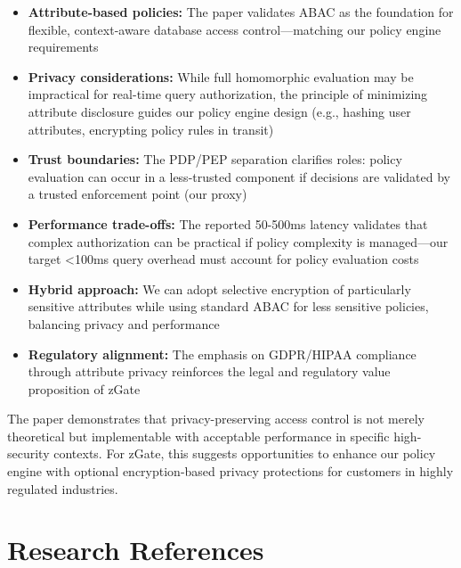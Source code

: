 \begin{itemize}
    \item \textbf{Attribute-based policies:} The paper validates ABAC as the foundation for flexible, context-aware database access control—matching our policy engine requirements
    \item \textbf{Privacy considerations:} While full homomorphic evaluation may be impractical for real-time query authorization, the principle of minimizing attribute disclosure guides our policy engine design (e.g., hashing user attributes, encrypting policy rules in transit)
    \item \textbf{Trust boundaries:} The PDP/PEP separation clarifies roles: policy evaluation can occur in a less-trusted component if decisions are validated by a trusted enforcement point (our proxy)
    \item \textbf{Performance trade-offs:} The reported 50-500ms latency validates that complex authorization can be practical if policy complexity is managed—our target <100ms query overhead must account for policy evaluation costs
    \item \textbf{Hybrid approach:} We can adopt selective encryption of particularly sensitive attributes while using standard ABAC for less sensitive policies, balancing privacy and performance
    \item \textbf{Regulatory alignment:} The emphasis on GDPR/HIPAA compliance through attribute privacy reinforces the legal and regulatory value proposition of zGate
\end{itemize}

The paper demonstrates that privacy-preserving access control is not merely theoretical but implementable with acceptable performance in specific high-security contexts. For zGate, this suggests opportunities to enhance our policy engine with optional encryption-based privacy protections for customers in highly regulated industries.


\section{Research References}

